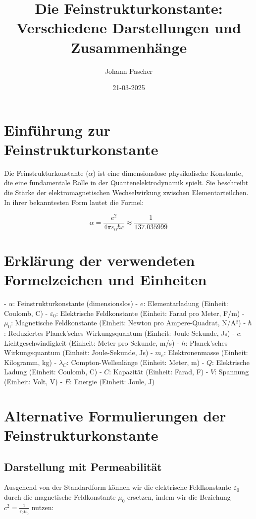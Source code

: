 \documentclass{article}
\title{Die Feinstrukturkonstante: Verschiedene Darstellungen und Zusammenhänge}
\author{Johann Pascher}
\date{21-03-2025}
\begin{document}
	
	\maketitle
	
	\section{Einführung zur Feinstrukturkonstante}
	
	Die Feinstrukturkonstante ($\alpha$) ist eine dimensionslose physikalische Konstante, die eine fundamentale Rolle in der Quantenelektrodynamik spielt. Sie beschreibt die Stärke der elektromagnetischen Wechselwirkung zwischen Elementarteilchen. In ihrer bekanntesten Form lautet die Formel:
	
	$$\alpha = \frac{e^2}{4\pi\varepsilon_0\hbar c} \approx \frac{1}{137.035999}$$
	\section{Erklärung der verwendeten Formelzeichen und Einheiten}
	
	- $\alpha$: Feinstrukturkonstante (dimensionslos)
	- $e$: Elementarladung (Einheit: Coulomb, C)
	- $\varepsilon_0$: Elektrische Feldkonstante (Einheit: Farad pro Meter, F/m)
	- $\mu_0$: Magnetische Feldkonstante (Einheit: Newton pro Ampere-Quadrat, N/A²)
	- $\hbar$: Reduziertes Planck'sches Wirkungsquantum (Einheit: Joule-Sekunde, Js)
	- $c$: Lichtgeschwindigkeit (Einheit: Meter pro Sekunde, m/s)
	- $h$: Planck'sches Wirkungsquantum (Einheit: Joule-Sekunde, Js)
	- $m_e$: Elektronenmasse (Einheit: Kilogramm, kg)
	- $\lambda_C$: Compton-Wellenlänge (Einheit: Meter, m)
	- $Q$: Elektrische Ladung (Einheit: Coulomb, C)
	- $C$: Kapazität (Einheit: Farad, F)
	- $V$: Spannung (Einheit: Volt, V)
	- $E$: Energie (Einheit: Joule, J)
	
	\section{Alternative Formulierungen der Feinstrukturkonstante}
	
	\subsection{Darstellung mit Permeabilität}
	Ausgehend von der Standardform können wir die elektrische Feldkonstante $\varepsilon_0$ durch die magnetische Feldkonstante $\mu_0$ ersetzen, indem wir die Beziehung $c^2 = \frac{1}{\varepsilon_0\mu_0}$ nutzen:
	
\end{document}
